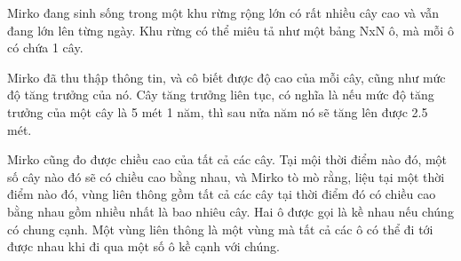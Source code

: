 Mirko đang sinh sống trong một khu rừng rộng lớn có rất nhiều cây cao và vẫn đang lớn lên từng ngày. Khu rừng có thể miêu tả như một bảng NxN ô, mà mỗi ô có chứa 1 cây.  

   Mirko đã thu thập thông tin, và cô biết được độ cao của mỗi cây, cũng như mức độ tăng trưởng của nó. Cây tăng trưởng liên tục, có nghĩa là nếu mức độ tăng trưởng của một cây là 5 mét 1 năm, thì sau nửa năm nó sẽ tăng lên được 2.5 mét.  

   Mirko cũng đo được chiều cao của tất cả các cây. Tại mội thời điểm nào đó, một số cây nào đó sẽ có chiều cao bằng nhau, và Mirko tò mò rằng, liệu tại một thời điểm nào đó, vùng liên thông gồm tất cả các cây tại thời điểm đó có chiều cao bằng nhau gồm nhiều nhất là bao nhiêu cây. Hai ô được gọi là kề nhau nếu chúng có chung cạnh. Một vùng liên thông là một vùng mà tất cả các ô có thể đi tới được nhau khi đi qua một số ô kề cạnh với chúng.